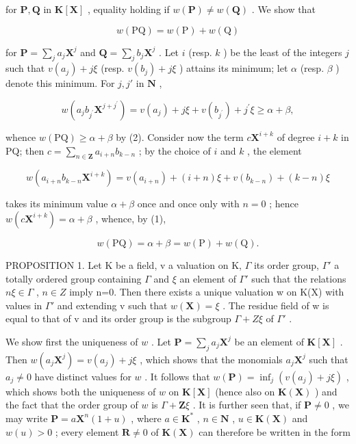 for \(\mathbf{P},\mathbf{Q}\) in \(\mathbf{K}[\mathbf{X}]\) , equality holding if \(w(\mathbf{P})\neq w(\mathbf{Q})\) . We show that

\[
w (\mathrm{PQ}) = w (\mathrm{P}) + w (\mathrm{Q})\tag{3}
\]

for \(\mathbf{P} = \sum_{j} a_{j} \mathbf{X}^{j}\) and \(\mathbf{Q} = \sum_{j} b_{j} \mathbf{X}^{j}\) . Let \(i\) (resp. \(k\) ) be the least of the integers \(j\) such that \(v(a_{j}) + j\xi\) (resp. \(v(b_{j}) + j\xi\) ) attains its minimum; let \(\alpha\) (resp. \(\beta\) ) denote this minimum. For \(j, j'\) in \(\mathbf{N}\) ,

\[
w (a _ {j} b _ {j ^ {\prime}} \mathbf {X} ^ {j + j ^ {\prime}}) = v (a _ {j}) + j \xi + v (b _ {j ^ {\prime}}) + j ^ {\prime} \xi \geqslant \alpha + \beta ,
\]

whence \(w(\mathrm{PQ}) \geqslant \alpha + \beta\) by (2). Consider now the term \(c\mathbf{X}^{i + k}\) of degree \(i + k\) in PQ; then \(c = \sum_{n \in \mathbf{Z}} a_{i + n} b_{k - n}\) ; by the choice of \(i\) and \(k\) , the element

\[
w (a _ {i + n} b _ {k - n} \mathbf {X} ^ {i + k}) = v (a _ {i + n}) + (i + n) \xi + v (b _ {k - n}) + (k - n) \xi
\]

takes its minimum value \(\alpha + \beta\) once and once only with \(n = 0\) ; hence \(w(c\mathbf{X}^{i + k}) = \alpha + \beta\) , whence, by (1),

\[
w (\mathrm{PQ}) = \alpha + \beta = w (\mathrm{P}) + w (\mathrm{Q}).
\]

PROPOSITION 1. Let K be a field, v a valuation on K, \(\Gamma\) its order group, \(\Gamma'\) a totally ordered group containing \(\Gamma\) and \(\xi\) an element of \(\Gamma'\) such that the relations \(n\xi\in\Gamma\) , \(n\in Z\) imply n=0. Then there exists a unique valuation w on K(X) with values in \(\Gamma'\) and extending v such that \(w(\mathbf{X})=\xi\) . The residue field of w is equal to that of v and its order group is the subgroup \(\Gamma+Z\xi\) of \(\Gamma'\) .

We show first the uniqueness of \(w\) . Let \(\mathbf{P} = \sum_{j} a_j \mathbf{X}^j\) be an element of \(\mathbf{K}[\mathbf{X}]\) . Then \(w(a_j \mathbf{X}^j) = v(a_j) + j\xi\) , which shows that the monomials \(a_j \mathbf{X}^j\) such that \(a_j \neq 0\) have distinct values for \(w\) . It follows that \(w(\mathbf{P}) = \inf_j (v(a_j) + j\xi)\) , which shows both the uniqueness of \(w\) on \(\mathbf{K}[\mathbf{X}]\) (hence also on \(\mathbf{K}(\mathbf{X})\) ) and the fact that the order group of \(w\) is \(\Gamma + \mathbf{Z}\xi\) . It is further seen that, if \(\mathbf{P} \neq 0\) , we may write \(\mathbf{P} = a\mathbf{X}^n (1 + u)\) , where \(a\in \mathbf{K}^*\) , \(n\in \mathbf{N}\) , \(u\in \mathbf{K}(\mathbf{X})\) and \(w(u) > 0\) ; every element \(\mathbf{R}\neq 0\) of \(\mathbf{K}(\mathbf{X})\) can therefore be written in the form

